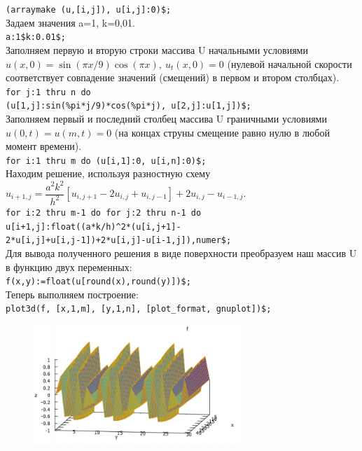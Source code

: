 \documentclass[article, bachelor, och, pract]{SCWorks}
\begin{document}
\begin{itemize}
\texttt{(arraymake (u,[i,j]), u[i,j]:0)\$;}\\
Задаем значения a=1, k=0,01.\\
\texttt{a:1\$k:0.01\$;}\\
Заполняем первую и вторую строки массива U начальными условиями \(u(x,0)=\sin(\pi x/9)\cos(\pi x), \ u_{t}(x,0)=0\) (нулевой начальной скорости соответствует совпадение значений (смещений) в первом и втором столбцах).\\
\texttt{for j:1 thru n do}\\
\texttt{(u[1,j]:sin(\%pi*j/9)*cos(\%pi*j), u[2,j]:u[1,j])\$;}\\
Заполняем первый и последний столбец массива U граничными условиями \(u(0,t)=u(m,t)=0\) (на концах струны смещение равно нулю в любой момент времени).\\
\texttt{for i:1 thru m do (u[i,1]:0, u[i,n]:0)\$;}\\
Находим решение, используя разностную схему\\
\(u_{i+1,j}=\dfrac{a^2 k^2}{h^2}[u_{i,j+1}-2u_{i,j}+u_{i,j-1}]+2u_{i,j}-u_{i-1,j}.\)\\
\texttt{for i:2 thru m-1 do for j:2 thru n-1 do}\\
\texttt{u[i+1,j]:float((a*k/h)\^{}2*(u[i,j+1]-}\\
\texttt{2*u[i,j]+u[i,j-1])+2*u[i,j]-u[i-1,j]),numer\$;}\\
Для вывода полученного решения в виде поверхности преобразуем наш массив U в функцию двух переменных:\\
\texttt{f(x,y):=float(u[round(x),round(y)])\$;}\\
Теперь выполняем построение:\\
\texttt{plot3d(f, [x,1,m], [y,1,n], [plot\_format, gnuplot])\$;}
\begin{figure}[h]
\begin{center}
\includegraphics[width=0.7\textwidth]{plot_two}
\end{center}
\end{figure}\\
\end{itemize}
\end{document}
